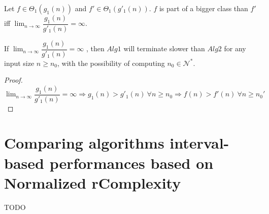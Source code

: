 \begin{definition}
Let $f \in \Theta_{1}(g_{1}(n))$ and $f' \in \Theta_{1}(g'_{1}(n))$. $f$ is part of a bigger class than $f'$ iff $\lim_{n\to\infty} \dfrac{g_{1}(n)}{g'_{1}(n)} = \infty$.
\end{definition}
\begin{lemma}
If  $ \lim_{n\to\infty} \dfrac{g_{1}(n)}{g'_{1}(n)} = \infty $ , then $Alg1$ will terminate slower than $Alg2$ for any input size $n \geq n_{0}$, with the possibility of computing $n_{0} \in \mathcal{N}^{*}$.
\end{lemma}
\begin{proof}
$\lim_{n\to\infty} \dfrac{g_{1}(n)}{g'_{1}(n)} = \infty \Rightarrow g_{1}(n) > g'_{1}(n)\ \forall n \geq n_{0} \Rightarrow f(n) > f'(n) \ \forall n \geq n_{0}'$
\end{proof}

\section{Comparing algorithms interval-based performances based on Normalized rComplexity}
TODO

